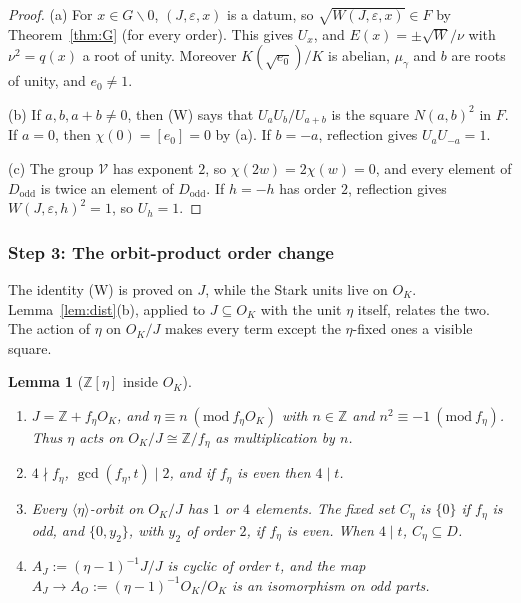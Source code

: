\documentclass[11pt]{amsart}
\numberwithin{equation}{section}
\theoremstyle{plain}
\newtheorem{lemma}[theorem]{Lemma}
\theoremstyle{definition}
\theoremstyle{remark}
\begin{document}
\begin{proof}
(a) For \(x\in G\smallsetminus0\), \((J,\varepsilon,x)\) is a datum, so \(\sqrt{W(J,\varepsilon,x)}\in F\) by Theorem~\ref{thm:G} (for every order). This gives \(U_x\), and \(E(x)=\pm\sqrt{W}/\nu\) with \(\nu^2=q(x)\) a root of unity. Moreover \(K(\sqrt{e_0})/K\) is abelian, \(\mu_\gamma\) and \(b\) are roots of unity, and \(e_0\ne1\).

(b) If \(a,b,a+b\ne0\), then (W) says that \(U_aU_b/U_{a+b}\) is the square \(N(a,b)^2\) in \(F\). If \(a=0\), then \(\chi(0)=[e_0]=0\) by (a). If \(b=-a\), reflection gives \(U_aU_{-a}=1\).

(c) The group \(\mathcal V\) has exponent \(2\), so \(\chi(2w)=2\chi(w)=0\), and every element of \(D_{\mathrm{odd}}\) is twice an element of \(D_{\mathrm{odd}}\). If \(h=-h\) has order \(2\), reflection gives \(W(J,\varepsilon,h)^2=1\), so \(U_h=1\).
\end{proof}

\subsubsection*{Step 3: The orbit-product order change}

The identity (W) is proved on \(J\), while the Stark units live on \(O_K\). Lemma~\ref{lem:dist}(b), applied to \(J\subseteq O_K\) with the unit \(\eta\) itself, relates the two. The action of \(\eta\) on \(O_K/J\) makes every term except the \(\eta\)-fixed ones a visible square.

\begin{lemma}[{\(\mathbb Z[\eta]\) inside \(O_K\)}]\label{lem:ZinOK}
\begin{enumerate}
\item[(a)] \(J=\mathbb Z+f_\eta O_K\), and \(\eta\equiv n\ (\mathrm{mod}\ f_\eta O_K)\) with \(n\in\mathbb Z\) and \(n^2\equiv-1\ (\mathrm{mod}\ f_\eta)\). Thus \(\eta\) acts on \(O_K/J\cong\mathbb Z/f_\eta\) as multiplication by \(n\).
\item[(b)] \(4\nmid f_\eta\), \(\gcd(f_\eta,t)\mid2\), and if \(f_\eta\) is even then \(4\mid t\).
\item[(c)] Every \(\langle\eta\rangle\)-orbit on \(O_K/J\) has \(1\) or \(4\) elements. The fixed set \(C_\eta\) is \(\{0\}\) if \(f_\eta\) is odd, and \(\{0,y_2\}\), with \(y_2\) of order \(2\), if \(f_\eta\) is even. When \(4\mid t\), \(C_\eta\subseteq D\).
\item[(d)] \(A_J:=(\eta-1)^{-1}J/J\) is cyclic of order \(t\), and the map \(A_J\to A_{O}:=(\eta-1)^{-1}O_K/O_K\) is an isomorphism on odd parts.
\end{enumerate}
\end{lemma}
\end{document}

